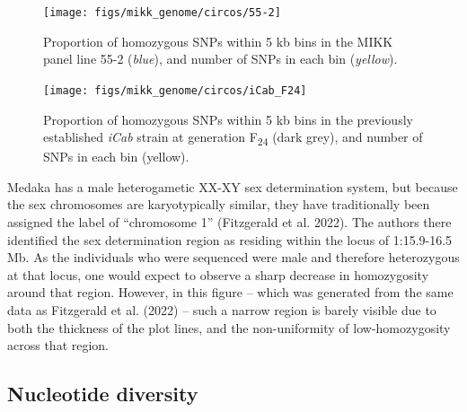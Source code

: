 \documentclass[
]{book}
\begin{document}
\begin{figure}
\texttt{[image: figs/mikk\_genome/circos/55-2]} \caption{Proportion of homozygous SNPs within 5 kb bins in the MIKK panel line 55-2 (\emph{blue}), and number of SNPs in each bin (\emph{yellow}).}\label{fig:circos-55-2}
\end{figure}



\begin{figure}
\texttt{[image: figs/mikk\_genome/circos/iCab\_F24]} \caption{Proportion of homozygous SNPs within 5 kb bins in the previously established \emph{iCab} strain at generation F\textsubscript{24} (dark grey), and number of SNPs in each bin (yellow).}\label{fig:circos-iCab-F24}
\end{figure}

Medaka has a male heterogametic XX-XY sex determination system, but because the sex chromosomes are karyotypically similar, they have traditionally been assigned the label of ``chromosome 1'' (Fitzgerald et al. 2022). The authors there identified the sex determination region as residing within the locus of 1:15.9-16.5 Mb. As the individuals who were sequenced were male and therefore heterozygous at that locus, one would expect to observe a sharp decrease in homozygosity around that region. However, in this figure -- which was generated from the same data as Fitzgerald et al. (2022) -- such a narrow region is barely visible due to both the thickness of the plot lines, and the non-uniformity of low-homozygosity across that region.

\hypertarget{nuc-div}{%
\subsection{Nucleotide diversity}\label{nuc-div}}
\end{document}
